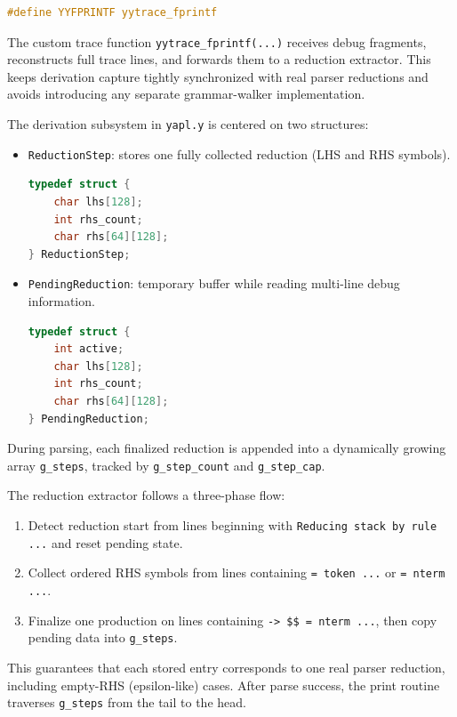 \documentclass[a4paper,12pt]{article}
\begin{document}
\begin{lstlisting}[language=C]
#define YYFPRINTF yytrace_fprintf
\end{lstlisting}

The custom trace function \texttt{yytrace\_fprintf(...)} receives debug fragments, reconstructs full trace lines, and forwards them to a reduction extractor. This keeps derivation capture tightly synchronized with real parser reductions and avoids introducing any separate grammar-walker implementation.

The derivation subsystem in \texttt{yapl.y} is centered on two structures:
\begin{itemize}
    \item \texttt{ReductionStep}: stores one fully collected reduction (LHS and RHS symbols).
    \begin{lstlisting}[language=C]
typedef struct {
    char lhs[128];
    int rhs_count;
    char rhs[64][128];
} ReductionStep;
    \end{lstlisting}
    \item \texttt{PendingReduction}: temporary buffer while reading multi-line debug information.
    \begin{lstlisting}[language=C]
typedef struct {
    int active;
    char lhs[128];
    int rhs_count;
    char rhs[64][128];
} PendingReduction;
    \end{lstlisting}
\end{itemize}





During parsing, each finalized reduction is appended into a dynamically growing array \texttt{g\_steps}, tracked by \texttt{g\_step\_count} and \texttt{g\_step\_cap}.

The reduction extractor follows a three-phase flow:
\begin{enumerate}
    \item Detect reduction start from lines beginning with \texttt{Reducing stack by rule ...} and reset pending state.
    \item Collect ordered RHS symbols from lines containing \texttt{= token ...} or \texttt{= nterm ...}.
    \item Finalize one production on lines containing \texttt{-> \$\$ = nterm ...}, then copy pending data into \texttt{g\_steps}.
\end{enumerate}

This guarantees that each stored entry corresponds to one real parser reduction, including empty-RHS (epsilon-like) cases. After parse success, the print routine traverses \texttt{g\_steps} from the tail to the head.
\end{document}
